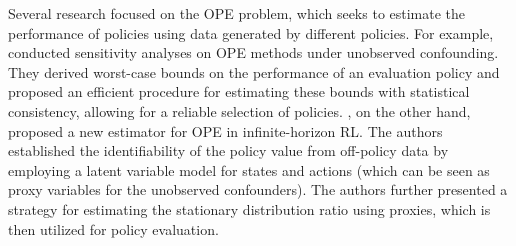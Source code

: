 \documentclass[10pt]{article} %
\theoremstyle{definition}
\begin{document}
Several research focused on the OPE problem, which seeks to estimate the performance of policies using data generated by different policies. For example, \citet{namkoongOffpolicyPolicyEvaluation2020a} conducted sensitivity analyses on OPE methods under unobserved confounding. They derived worst-case bounds on the performance of an evaluation policy and proposed an efficient procedure for estimating these bounds with statistical consistency, allowing for a reliable selection of policies. 
\citet{bennettOffpolicyEvaluationInfiniteHorizon2021a}, on the other hand, proposed a new estimator for OPE in infinite-horizon RL. The authors established the identifiability of the policy value from off-policy data by employing a latent variable model for states and actions (which can be seen as proxy variables for the unobserved confounders). The authors further presented a strategy for estimating the stationary distribution ratio using proxies, which is then utilized for policy evaluation.
\end{document}
